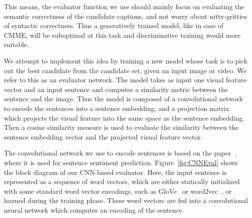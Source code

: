This means, the evaluator function we use should mainly focus on evaluating the
semantic correctness of the candidate captions, and not worry about
nitty-gritties of syntactic correctness. 
Thus a generatively trained model, like in case of CMME, will be suboptimal at
this task and discriminative training would more suitable. 

We attempt to implement this idea by training a new model whose task
is to pick out the best candidate from the candidate set, given an
input image or video.
We refer to this as an evaluator network.
The model takes as input one visual feature vector and an input sentence and
computes a similarity metric between the sentence and the image. 
Thus the model is composed of a convolutional network to encode the sentences
into a sentence embedding, and a projection matrix which projects the visual
feature into the same space as the sentence embedding.
Then a cosine similarity measure is used to evaluate the similarity between the
sentence embedding vector and the projected visual feature vector. 

The convolutional network we use to encode sentences is based on the
paper~\cite{kim:2014:CNNsent}, where it is used for sentence sentiment
prediction.
Figure~\ref{fig:CNNEval} shows the block diagram of our CNN-based evaluator.  
Here, the input sentence is represented as a sequence of word vectors, which are
either statically initialized with some standard word vector encodings, such as
GloVe~\cite{pennington2014glove} or word2vec~\cite{mikolov2013distributed}, or
learned during the training phase.
These word vectors are fed into a convolutional neural network which computes an
encoding of the sentence.


